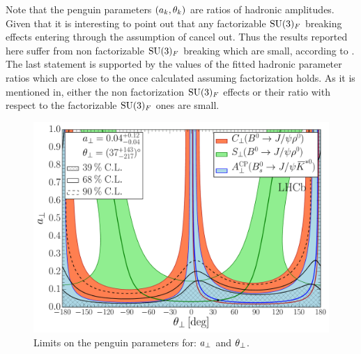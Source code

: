 Note that the penguin parameters $(a_k,\theta_k)$ are ratios of hadronic amplitudes. Given that it is
interesting to point out that any factorizable $\mathrm{SU}(3)_F$ breaking effects entering through the assumption
of  cancel out.
Thus the results reported here suffer from non factorizable $\mathrm{SU}(3)_F$ breaking which are small,
according to \cite{DeBruyn-thesis}. The last statement is supported by the values of the fitted hadronic parameter
ratios which are close to the once calculated assuming factorization holds. As it is mentioned in\cite{DeBruyn-thesis},
either the non factorization $\mathrm{SU}(3)_F$ effects or their ratio with respect to the factorizable $\mathrm{SU}(3)_F$
ones are small.


\begin{figure}[!t]
  \centering
  \includegraphics[trim=0.0cm 0.0cm 0.0cm 0.0cm, clip=true,scale=0.33]{Figures/Chapter5/Penguin_Contribution_Ang_vs_Abs_allB2VV_Perp.pdf}
  \caption{Limits on the penguin parameters for: $a_{\perp}$ and $\theta_{\perp}$.}
  \label{pengPlot_perp}
\end{figure}


